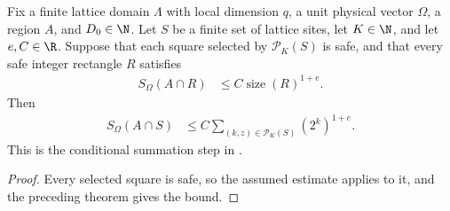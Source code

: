 \begin{lemma}
    \label{thm:area_law_capped_dyadic_entropy_cover}
    \leanok
    Fix a finite lattice domain $\Lambda$ with local dimension $q$,
    a unit physical vector $\Omega$, a region $A$, and $D_0\in\N$.
    Let $S$ be a finite set of lattice sites, let $K\in\N$, and let
    $e,C\in\R$. Suppose that each square selected by $\mathcal P_K(S)$
    is safe, and that every safe integer rectangle $R$ satisfies
    \begin{align}
        S_\Omega(A\cap R) & \le C\operatorname{size}(R)^{1+e}.
    \end{align}
    Then
    \begin{align}
        S_\Omega(A\cap S)
         & \le C\sum_{(k,z)\in\mathcal P_K(S)}(2^k)^{1+e}.
    \end{align}
    This is the conditional summation step in
    \cite[proof of Lemma~9.4, lines~651--664]{OpenAI2026AreaLaw}.
\end{lemma}
\begin{proof}
    \leanok
    Every selected square is safe, so the assumed estimate applies to
    it, and the preceding theorem gives the bound.
\end{proof}

